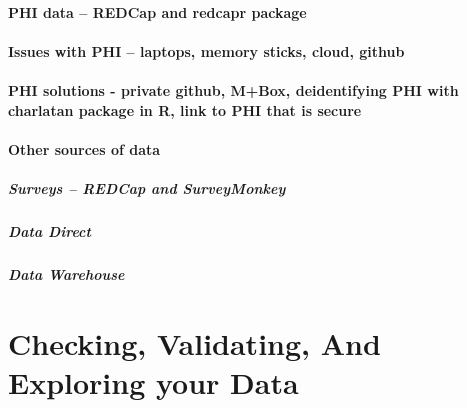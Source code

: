 \documentclass[]{book}
\let\oldparagraph\paragraph
\renewcommand{\paragraph}[1]{\oldparagraph{#1}\mbox{}}
\theoremstyle{definition}
\theoremstyle{definition}
\theoremstyle{definition}
\theoremstyle{remark}
\begin{document}
\hypertarget{phi-data-redcap-and-redcapr-package}{%
\subsubsection{PHI data -- REDCap and redcapr
package}\label{phi-data-redcap-and-redcapr-package}}

\hypertarget{issues-with-phi-laptops-memory-sticks-cloud-github}{%
\subsubsection{Issues with PHI -- laptops, memory sticks, cloud,
github}\label{issues-with-phi-laptops-memory-sticks-cloud-github}}

\hypertarget{phi-solutions---private-github-mbox-deidentifying-phi-with-charlatan-package-in-r-link-to-phi-that-is-secure}{%
\subsubsection{PHI solutions - private github, M+Box, deidentifying PHI
with charlatan package in R, link to PHI that is
secure}\label{phi-solutions---private-github-mbox-deidentifying-phi-with-charlatan-package-in-r-link-to-phi-that-is-secure}}

\hypertarget{other-sources-of-data}{%
\subsubsection{Other sources of data}\label{other-sources-of-data}}

\hypertarget{surveys-redcap-and-surveymonkey}{%
\paragraph{Surveys -- REDCap and
SurveyMonkey}\label{surveys-redcap-and-surveymonkey}}

\hypertarget{data-direct}{%
\paragraph{Data Direct}\label{data-direct}}

\hypertarget{data-warehouse}{%
\paragraph{Data Warehouse}\label{data-warehouse}}

\hypertarget{checking-validating-and-exploring-your-data}{%
\chapter{Checking, Validating, And Exploring your
Data}\label{checking-validating-and-exploring-your-data}}
\end{document}

